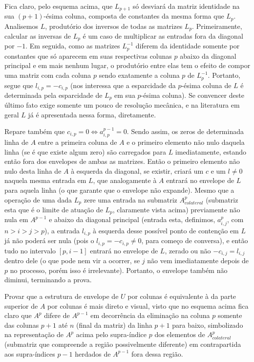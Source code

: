 \documentclass[a4paper, 12pt]{article}
\begin{document}
\\
Fica claro, pelo esquema acima, que $L_{p+1}$ só desviará da matriz identidade na sua $(p+1)$-ésima coluna, composta de constantes da mesma forma que $L_p$. Analisemos $L$, produtório dos inversos de todas as matrizes $L_p$. Primeiramente, calcular as inversas de $L_p$ é um caso de multiplicar as entradas fora da diagonal por $-1$. Em seguida, como as matrizes $L_p^{-1}$ diferem da identidade somente por constantes que só aparecem em suas respectivas colunas $p$ abaixo da diagonal principal e em mais nenhum lugar, o produtório entre elas tem o efeito de compor uma matriz com cada coluna $p$ sendo exatamente a coluna $p$ de $L_p^{-1}$. Portanto, segue que $l_{i,p}= -c_{i,p}$ (nos interessa que a esparcidade da $p$-ésima coluna de $L$ é determinada pela esparcidade de $L_p$ em sua $p$-ésima coluna). Se convencer deste último fato exige somente um pouco de resolução mecânica, e na literatura em geral $L$ já é apresentada nessa forma, diretamente. 

Repare também que $c_{i,p}=0 \Leftrightarrow a_{i,p}^{p-1}=0$. Sendo assim, os zeros de determinada linha de $A$ entre a primeira coluna de $A$ e o primeiro elemento não nulo daquela linha (se é que existe algum zero) são carregados para $L$ imediatamente, estando então fora dos envelopes de ambas as matrizes. Então o primeiro elemento não nulo desta linha de $A$ à esquerda da diagonal, se existir, criará um $c\text{ e um }l\neq0$ naquela mesma entrada em $L$, que analogamente à $A$ entrará no envelope de $L$ para aquela linha (o que garante que o envelope não expande). Mesmo que a operação de uma dada $L_p$ zere uma entrada na submatriz $A_{colateral}^p$ (submatriz esta que é o limite de atuação de $L_p$, claramente vista acima) previamente não nula em $A^{p-1}$ e abaixo da diagonal principal (entrada esta, definimos, $a^p_{i,j}$, com $n>i>j>p$), a entrada $l_{i,p}$ à esquerda desse possível ponto de contenção em $L$ já não poderá ser nula (pois o $l_{i,p}=-c_{i,p}\neq 0$, para começo de conversa), e então tudo no intervalo $[p,i-1]$ entrará no envelope de $L$, zerado ou não $-c_{i,j}=l_{i,j}$ dentro dele (o que pode nem vir a ocorrer, se $j$ não vem imediatamente depois de $p$ no processo, porém isso é irrelevante). Portanto, o envelope também não diminui, terminando a prova.

Provar que a estrutura de envelope de $U$ por colunas é equivalente à da parte superior de $A$ por colunas é mais direto e visual, visto que no esquema acima fica claro que $A^p$ difere de $A^{p-1}$ em decorrência da eliminação na coluna $p$ somente das colunas $p+1$ até $n$ (final da matriz) da linha $p+1$ para baixo, simbolizado na representação de $A^p$ acima pelo supra-índice $p$ dos elementos de $A^p_{colateral}$ (submatriz que compreende a região possivelmente diferente) em contrapartida aos supra-índices $p-1$ herdados de $A^{p-1}$ fora dessa região. 
\end{document}
